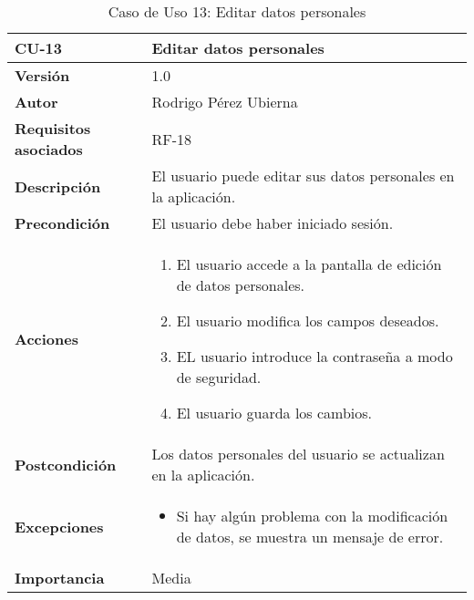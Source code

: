 \begin{table}[p]
	\centering
	\begin{tabularx}{\linewidth}{ p{} p{} }
		\toprule
		\textbf{CU-13} & \textbf{Editar datos personales}\\
		\toprule
		\textbf{Versión} & 1.0 \\
		\textbf{Autor} & Rodrigo Pérez Ubierna \\
		\textbf{Requisitos asociados} & RF-18 \\
		\textbf{Descripción} & El usuario puede editar sus datos personales en la aplicación. \\
		\textbf{Precondición} & El usuario debe haber iniciado sesión. \\
		\textbf{Acciones} &
		\begin{enumerate}
			\def\labelenumi{\arabic{enumi}.}
			\tightlist
			\item El usuario accede a la pantalla de edición de datos personales.
			\item El usuario modifica los campos deseados.
			\item EL usuario introduce la contraseña a modo de seguridad.
			\item El usuario guarda los cambios.
		\end{enumerate}\\
		\textbf{Postcondición} & Los datos personales del usuario se actualizan en la aplicación. \\
		\textbf{Excepciones} &
			\begin{itemize}
				\item Si hay algún problema con la modificación de datos, se muestra un mensaje de error.
			\end{itemize} \\
		\textbf{Importancia} & Media \\
		\bottomrule
	\end{tabularx}
	\caption{Caso de Uso 13: Editar datos personales}
\end{table}

